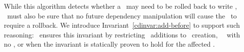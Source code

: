 While this algorithm detects whether a \chdesc\ may need to be rolled
back to write \ChAll, \Kudos\ must also be sure that no future
dependency manipulation will cause the \chdesc\ to require a rollback.
%
We introduce Invariant~\ref{cdinvar:add-before} to support such reasoning:
%
%
\noindent \Kudos\ ensures this invariant by restricting \before\
additions to \chdesc\ creation, \noop\ \chdescs\ with no \afters, or
when the invariant is statically proven to hold for the affected
\chdescs.
